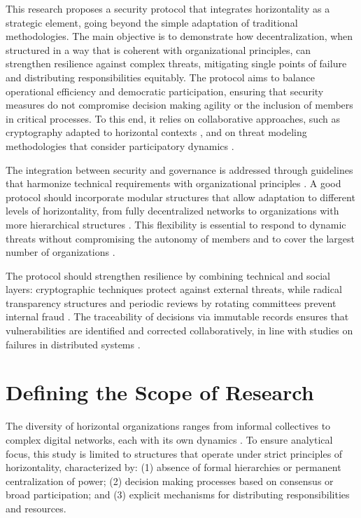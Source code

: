 This research proposes a security protocol that integrates horizontality as a
strategic element, going beyond the simple adaptation of traditional
methodologies. The main objective is to demonstrate how
decentralization, when structured in a way that is coherent with organizational
principles, can strengthen resilience against complex threats, mitigating single
points of failure and distributing responsibilities equitably. The protocol aims to balance
operational efficiency and democratic participation, ensuring that security
measures do not compromise decision making agility or the inclusion of members
in critical processes. To this end, it relies on
collaborative approaches, such as cryptography adapted to horizontal contexts
\cite{Colbac}, and on threat modeling methodologies that consider participatory
dynamics \cite{ParticipatoryThreatModelling}.

The integration between security and governance is addressed through guidelines
that harmonize technical requirements with organizational principles
\cite{ParticipatoryThreatModelling}. A good protocol should incorporate
modular structures that allow adaptation to different levels of
horizontality, from fully decentralized networks to organizations with more
hierarchical structures \cite{Colbac}. This flexibility is essential to respond
to dynamic threats without compromising the autonomy of members and to cover the
largest number of organizations \cite{Colbac}.

The protocol should strengthen resilience by combining technical and social layers:
cryptographic techniques protect against external threats, while radical
transparency structures and periodic reviews by rotating committees prevent
internal fraud \cite{EverydayRevolutions}. The traceability of decisions via
immutable records ensures that vulnerabilities are identified and corrected
collaboratively, in line with studies on failures in distributed systems
\cite{Reputation-basedDAO}.

\section{Defining the Scope of Research}
\label{sec:defining_research_scope}

The diversity of horizontal organizations ranges from informal collectives to
complex digital networks, each with its own dynamics \cite{EverydayRevolutions}.
To ensure analytical focus, this study is limited to structures that operate
under strict principles of horizontality, characterized by: (1) absence of
formal hierarchies or permanent centralization of power; (2) decision making
processes based on consensus or broad participation; and (3) explicit mechanisms
for distributing responsibilities and resources.

